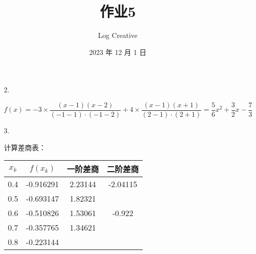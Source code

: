 \documentclass{sjtuarticle}
\title{作业5}
\author{Log Creative}
\date{2023 年 12 月 1 日}
\begin{document}
\maketitle


\begin{itemize}
    \item[2.] \begin{solution}
    \begin{equation*}
        f(x)=-3\times \frac{(x-1)(x-2)}{(-1-1)\cdot (-1-2)}+4\times \frac{(x-1)(x+1)}{(2-1)\cdot (2+1)}=\frac{5}{6}x^2+\frac{3}{2}x-\frac{7}{3}
    \end{equation*}
    \end{solution}
    \item[3.] \begin{solution}
        计算差商表：
        
        \begin{table}[H]
            \centering
            \begin{tabular}{cccc}
                \toprule
                $x_k$ & $f(x_k)$ & 一阶差商 & 二阶差商 \\
                \midrule
                0.4 & -0.916291 & 2.23144 & -2.04115 \\
                0.5 & -0.693147 & 1.82321 & \\
                0.6 & -0.510826 & 1.53061 & -0.922 \\
                0.7 & -0.357765 & 1.34621 &\\
                0.8 & -0.223144 & \\
                \bottomrule
            \end{tabular}
        \end{table}


\end{solution}
\end{itemize}
\end{document}
